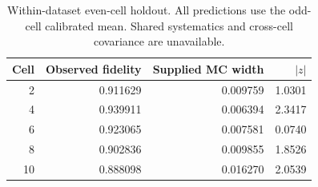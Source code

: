 \begin{table}[htbp]
\centering\small
\begin{tabular}{rrrr}
\toprule
Cell & Observed fidelity & Supplied MC width & $|z|$ \\
\midrule
2 & 0.911629 & 0.009759 & 1.0301 \\
4 & 0.939911 & 0.006394 & 2.3417 \\
6 & 0.923065 & 0.007581 & 0.0740 \\
8 & 0.902836 & 0.009855 & 1.8526 \\
10 & 0.888098 & 0.016270 & 2.0539 \\
\bottomrule\end{tabular}
\caption{Within-dataset even-cell holdout. All predictions use the odd-cell calibrated mean. Shared systematics and cross-cell covariance are unavailable.}
\end{table}
